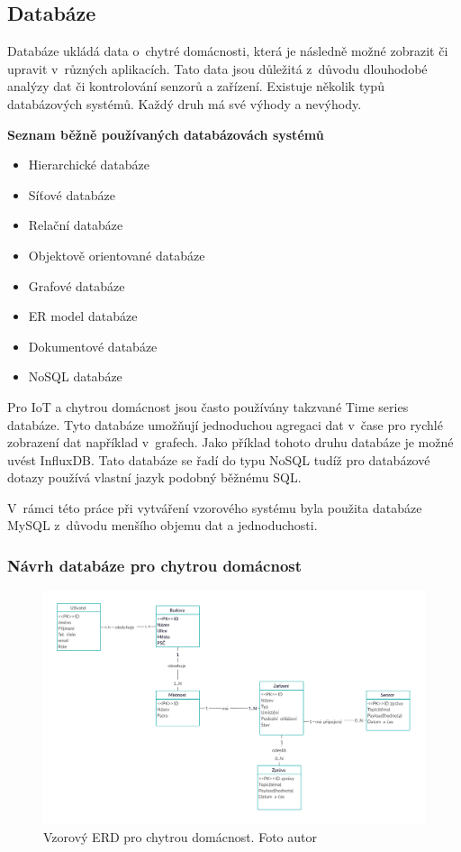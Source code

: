 \subsection*{Databáze}
Databáze ukládá data o~chytré domácnosti, která je následně možné zobrazit či upravit v~různých aplikacích. Tato data jsou důležitá z~důvodu dlouhodobé analýzy dat či kontrolování senzorů a zařízení. Existuje několik typů databázových systémů. Každý druh má své výhody a nevýhody.

\noindent\textbf{Seznam běžně používaných databázovách systémů}\cite{database-list}
\begin{itemize}
  \item Hierarchické databáze
  \item Síťové databáze
  \item Relační databáze
  \item Objektově orientované databáze
  \item Grafové databáze
  \item ER model databáze
  \item Dokumentové databáze
  \item NoSQL databáze
\end{itemize}

Pro IoT a chytrou domácnost jsou často používány takzvané Time series databáze. Tyto databáze umožňují jednoduchou agregaci dat v~čase pro rychlé zobrazení dat například v~grafech. Jako příklad tohoto druhu databáze je možné uvést InfluxDB. Tato databáze se řadí do typu NoSQL tudíž pro databázové dotazy používá vlastní jazyk podobný běžnému SQL.

V~rámci této práce při vytváření vzorového systému byla použita databáze MySQL z~důvodu menšího objemu dat a jednoduchosti.

\subsubsection*{Návrh databáze pro chytrou domácnost}

\begin{figure}[H]
  \centering
  \includegraphics[width=\textwidth]{obrazky-figures/diagrams/EDRForSmartHome.pdf}
  \caption{Vzorový ERD pro chytrou domácnost. Foto autor}
  \label{EDRForSmartHome}
\end{figure}

